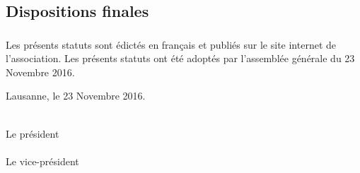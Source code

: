 \documentclass[12pt,a4paper,oneside]{article}
\newcounter{art}
\newcommand{\french}{    \switchcolumn[1]\noindent}
\newcounter{para}
\begin{document}
\begin{paracol}{2}
\french
	\subsection{Dispositions finales}

	\subsubsection{}
	Les présents statuts sont édictés en français et publiés sur le site internet de l’association. Les présents statuts ont été adoptés par l’assemblée générale du 23 Novembre 2016.


 	\vspace{\fill}

	\noindent
	Lausanne, le 23 Novembre 2016.
	\vspace {1.5cm}

	\noindent
	\hrulefill \\
 	Le président \\

	\vspace {1.0cm}
 	\noindent 
 	\hrulefill \\
 	Le vice-président\\


\clearpage

% 



\end{paracol}
\end{document}
